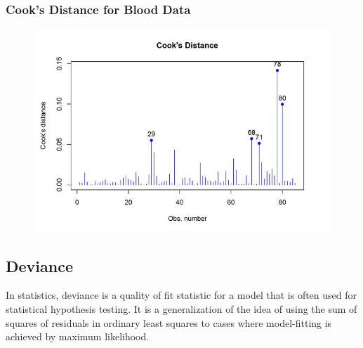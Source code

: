 \documentclass[Main.tex]{subfiles}
\begin{document}
\newpage
\subsubsection{Cook's Distance for Blood Data}
\begin{figure}[h!]
	\centering
	\includegraphics[width=0.9\linewidth]{images/CooksDistancePlot-JS-Roy}
\end{figure}


\newpage
\subsection{Deviance}
In statistics, deviance is a quality of fit statistic for a model that is often used for statistical hypothesis testing. It is a generalization of the idea of using the sum of squares of residuals in ordinary least squares to cases where model-fitting is achieved by maximum likelihood.




\end{document}
